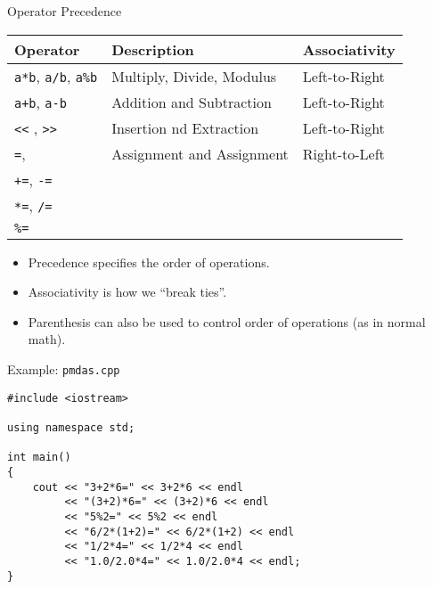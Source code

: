 \documentclass[]{beamer}
\begin{document}
\begin{frame}{Operator Precedence}
    \begin{tabular}{|l|l|l|}
        \hline
        \textbf{Operator} & \textbf{Description} & \textbf{Associativity} \\
        \hline
        \texttt{a*b}, \texttt{a/b}, \texttt{a\%b} & Multiply, Divide, Modulus & Left-to-Right\\
        \hline
        \texttt{a+b}, \texttt{a-b} & Addition and Subtraction & Left-to-Right\\
        \hline
        \texttt{<<} , \texttt{>>} & Insertion nd Extraction & Left-to-Right \\
        \hline
        \texttt{=},  & Assignment and Assignment & Right-to-Left \\
        \texttt{+=}, \texttt{-=} & & \\
        \texttt{*=}, \texttt{/=} & & \\
        \texttt{\%=} & & \\
        \hline
    \end{tabular}

    \begin{itemize}[<+->]
        \item Precedence specifies the order of operations.
        \item Associativity is how we ``break ties''.
        \item Parenthesis can also be used to control order of
            operations (as in normal math).
    \end{itemize}
\end{frame}


\begin{frame}[fragile]{Example: \texttt{pmdas.cpp}}
    \begin{adjustbox}{max height=0.8\textheight}
    \begin{BVerbatim}
#include <iostream>

using namespace std;

int main()
{
    cout << "3+2*6=" << 3+2*6 << endl
         << "(3+2)*6=" << (3+2)*6 << endl
         << "5%
         << "6/2*(1+2)=" << 6/2*(1+2) << endl
         << "1/2*4=" << 1/2*4 << endl
         << "1.0/2.0*4=" << 1.0/2.0*4 << endl;
}
    \end{BVerbatim}
    \end{adjustbox}
\end{frame}
\end{document}
